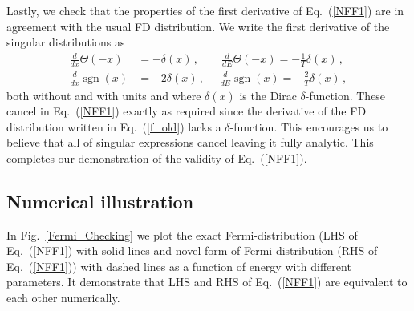 \documentclass[sn-mathphys,Numbered]{sn-jnl}
\newcommand{\req}[1]{Eq.~(\ref{#1})}
\DeclareMathOperator{\sgn}{sgn}
\begin{document}
Lastly, we check that the properties of the first derivative of \req{NFF1} are in agreement with the usual FD distribution. We write the first derivative of the singular distributions as 
\begin{align}
\label{NFF1b}
\frac{d}{dx}\Theta(-x)&=-\delta(x)\,,\qquad 
\frac{d}{dE}\Theta(-x)=-\frac{1}{T}\delta(x)\,,\\
\frac{d}{dx}\sgn(x)&=-2\delta(x)\,,\,\,\quad 
\frac{d}{dE}\sgn(x)=-\frac{2}{T}\delta(x)\,,
\end{align}
both without and with units and where $\delta(x)$ is the Dirac $\delta$-function. These cancel in \req{NFF1} exactly as required since the derivative of the FD distribution written in \req{f_old} lacks a $\delta$-function. This encourages us to believe that all of singular expressions cancel leaving it fully analytic. This completes our demonstration of the validity of \req{NFF1}. 

\subsection{Numerical illustration}
In Fig.~\ref{Fermi_Checking} we plot the exact Fermi-distribution (LHS of Eq.~(\ref{NFF1}) with solid lines and novel form of Fermi-distribution (RHS of Eq.~(\ref{NFF1})) with dashed lines as a function of energy with different parameters. It demonstrate that 
LHS and RHS of Eq.~(\ref{NFF1}) are equivalent to each other numerically.
\end{document}
